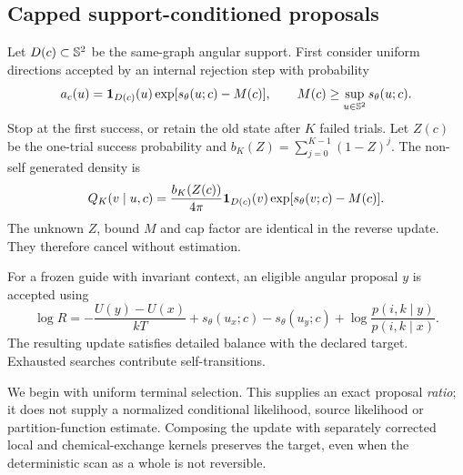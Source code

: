 \subsection{Capped support-conditioned proposals}
Let $D(c)\subset\mathbb S^2$ be the same-graph angular support. First consider uniform
directions accepted by an internal rejection step with probability
\begin{equation}
 a_c(u)={\bf 1}_{D(c)}(u)\exp[s_\theta(u;c)-M(c)],
 \qquad M(c)\ge\sup_{u\in\mathbb S^2}s_\theta(u;c).
\end{equation}
Stop at the first success, or retain the old state after $K$ failed trials. Let
$Z(c)$ be the one-trial success probability and
$b_K(Z)=\sum_{j=0}^{K-1}(1-Z)^j$. The non-self generated density is
\begin{equation}
 Q_K(v\mid u,c)=\frac{b_K(Z(c))}{4\pi}
 {\bf 1}_{D(c)}(v)\exp[s_\theta(v;c)-M(c)].
\end{equation}
The unknown $Z$, bound $M$ and cap factor are identical in the reverse update.
They therefore cancel without estimation.

\begin{proposition}
For a frozen guide with invariant context, an eligible angular proposal $y$ is
accepted using
\begin{equation}
 \log R=-\frac{U(y)-U(x)}{kT}
 +s_\theta(u_x;c)-s_\theta(u_y;c)
 +\log\frac{p(i,k\mid y)}{p(i,k\mid x)}.
 \label{eq:angular-mh}
\end{equation}
The resulting update satisfies detailed balance with the declared target.
Exhausted searches contribute self-transitions.
\end{proposition}
We begin with uniform terminal selection. This supplies an exact proposal
\emph{ratio}; it does not supply a normalized conditional likelihood, source
likelihood or partition-function estimate. Composing the update with separately
corrected local and chemical-exchange kernels preserves the target, even when
the deterministic scan as a whole is not reversible.

